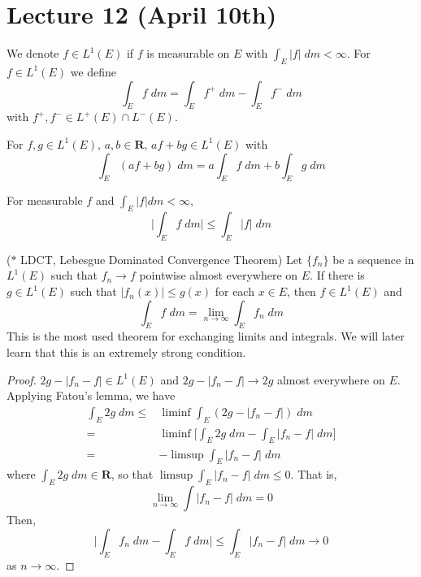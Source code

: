 \section{Lecture 12 (April 10th)}
\begin{recall}
We denote $f\in L^{1}(E)$ if $f$ is measurable on $E$ with $\int _{E}|f|\;d m<\infty $. For $f\in L^{1}(E)$ we define
\[\int _{E}f\;d m=\int _{E}f^{+}\;d m-\int _{E}f^{-}\;d m\]
with $f^{+},f^{-}\in L^{+}(E)\cap L^{-}(E)$.
\end{recall}
\vspace{2ex}
\begin{thm}
For $f,g\in L^{1}(E)$, $a,b\in {\bm R}$, $af+bg\in L^{1}(E)$ with
\[\int _{E}(af+bg)\;d m=a\int _{E}f\;d m+b\int _{E}g\;d m\]
\end{thm}
\vspace{2ex}
\begin{prop}
For measurable $f$ and $\int _{E}|f|dm<\infty $, 
\[\Big|\int _{E}f\;d m\Big|\leq \int _{E}|f|\;dm\]
\end{prop}
\vspace{2ex}
\begin{thm}
($\ast$ LDCT, Lebesgue Dominated Convergence Theorem) Let $\{f_{n}\}$ be a sequence in $L^{1}(E)$ such that $f_{n}\rightarrow f$ pointwise almost everywhere on $E$. If there is $g\in L^{1}(E)$ such that $|f_{n}(x)|\leq g(x)$ for each $x\in E$, then $f\in L^{1}(E)$ and 
\[\int _{E}f\;d m=\lim _{n\rightarrow \infty }\int _{E}f_{n}\;d m\]
This is the most used theorem for exchanging limits and integrals. We will later learn that this is an extremely strong condition.
\end{thm}
\vspace{2ex}
\begin{proof}
$2g-|f_{n}-f|\in L^{1}(E)$ and $2g-|f_{n}-f|\rightarrow 2g$ almost everywhere on $E$. Applying Fatou's lemma, we have
\begin{align*}
\int _{E}2g\;d m\leq& \liminf \int _{E}(2g-|f_{n}-f|)\;d m\\
=&\liminf \Big[\int _{E}2g\;d m-\int _{E}|f_{n}-f|\;d m\Big]\\
=&-\limsup \int _{E}|f_{n}-f|\;d m
\end{align*}
where $\int _{E}2g\;d m\in {\bm R}$, so that $\limsup\int _{E}|f_{n}-f|\;d m\leq 0$. That is,
\[\lim _{n\rightarrow \infty }\int |f_{n}-f|\;d m=0\]
Then,
\[\Big|\int _{E}f_{n}\;d m-\int _{E}f\;d m\Big|\leq \int _{E}|f_{n}-f|\;d m\rightarrow 0\]
as $n\rightarrow \infty $. 
\end{proof}
\vspace{2ex}
